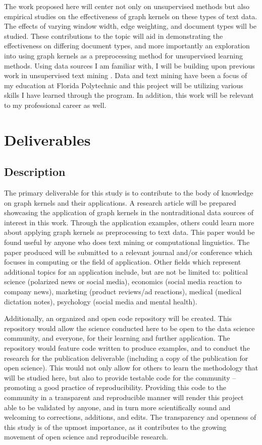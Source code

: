 \documentclass[11pt]{report}
\begin{document}
The work proposed here will center not only on unsupervised methods but also empirical studies on the effectiveness of graph kernels on these types of text data. The effects of varying window width, edge weighting, and document types will be studied. These contributions to the topic will aid in demonstrating the effectiveness on differing document types, and more importantly an exploration into using graph kernels as a preprocessing method for unsupervised learning methods. Using data sources I am familiar with, I will be building upon previous work in unsupervised text mining \cite{akioyamen2020framework}. Data and text mining have been a focus of my education at Florida Polytechnic and this project will be utilizing various skills I have learned through the program. In addition, this work will be relevant to my professional career as well.




\section{Deliverables}
\subsection{Description}
The primary deliverable for this study is to contribute to the body of knowledge on graph kernels and their applications. A research article will be prepared showcasing the application of graph kernels in the nontraditional data sources of interest in this work. Through the application examples, others could learn more about applying graph kernels as preprocessing to text data. This paper would be found useful by anyone who does text mining or computational linguistics. The paper produced will be submitted to a relevant journal and/or conference which focuses in computing or the field of application. Other fields which represent additional topics for an application include, but are not be limited to: political science (polarized news or social media), economics (social media reaction to company news), marketing (product reviews/ad reactions), medical (medical dictation notes), psychology (social media and mental health). 

Additionally, an organized and open code repository will be created. This repository would allow the science conducted here to be open to the data science community, and everyone, for their learning and further application. The repository would feature code written to produce examples, and to conduct the research for the publication deliverable (including a copy of the publication for open science). This would not only allow for others to learn the methodology that will be studied here, but also to provide testable code for the community -- promoting a good practice of reproducibility. Providing this code to the community in a transparent and reproducible manner will render this project able to be validated by anyone, and in turn more scientifically sound and welcoming to corrections, additions, and edits. The transparency and openness of this study is of the upmost importance, as it contributes to the growing movement of open science and reproducible research. 
\end{document}
